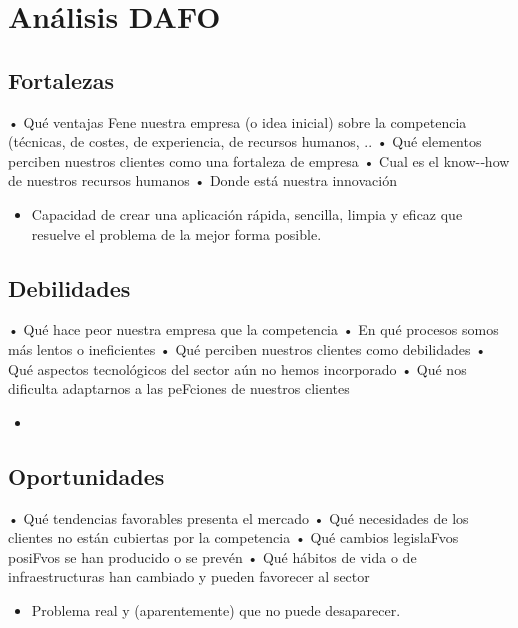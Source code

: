 \section{Análisis DAFO}  

\subsection{Fortalezas}
• Qué ventajas Fene nuestra empresa (o idea inicial) sobre la competencia (técnicas, de costes, de experiencia, de recursos humanos, .. 
• Qué elementos perciben nuestros clientes como una fortaleza de empresa 
• Cual es el know-­‐how de nuestros recursos humanos 
• Donde está nuestra innovación 

\begin{itemize}
    \item Capacidad de crear una aplicación rápida, sencilla, limpia y eficaz que resuelve el problema de la mejor forma posible.
\end{itemize}

\subsection{Debilidades}
• Qué hace peor nuestra empresa que la competencia 
• En qué procesos somos más lentos o ineficientes 
• Qué perciben nuestros clientes como debilidades 
• Qué aspectos tecnológicos del sector aún no hemos incorporado 
• Qué nos dificulta adaptarnos a las peFciones de nuestros clientes 

\begin{itemize}
    \item 
\end{itemize}

\subsection{Oportunidades}
• Qué tendencias favorables presenta el mercado 
• Qué necesidades de los clientes no están cubiertas por la competencia 
• Qué cambios legislaFvos posiFvos se han producido o se prevén 
• Qué hábitos de vida o de infraestructuras han cambiado y pueden favorecer al sector 

\begin{itemize}
    \item Problema real y (aparentemente) que no puede desaparecer.
\end{itemize}

